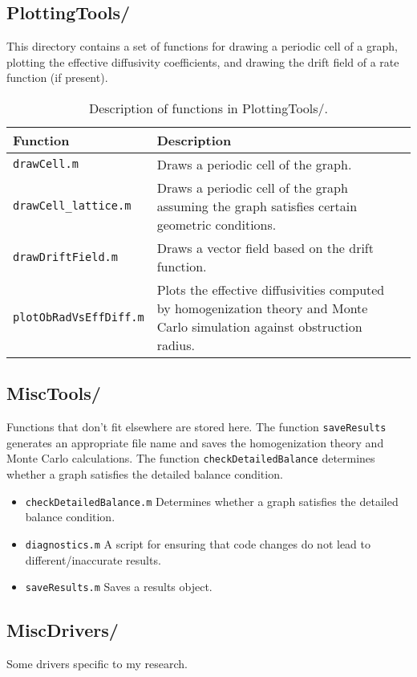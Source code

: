 \documentclass[11pt, oneside]{article}   	%
\theoremstyle{definition}
\begin{document}
\subsection{PlottingTools/}
This directory contains a set of functions for drawing a periodic cell of a graph, plotting the effective diffusivity coefficients, and drawing the drift field of a rate function (if present).
\begin{table}[h]
\centering
\begin{tabularx}{\linewidth}{lLL} %
	\toprule
	Function     & Description \\
	\midrule
	\texttt{drawCell.m} & Draws a periodic cell of the graph. \\ \hline
	\texttt{drawCell\_lattice.m} & Draws a periodic cell of the graph assuming the graph satisfies certain geometric conditions. \\ \hline
	\texttt{drawDriftField.m} & Draws a vector field based on the drift function. \\ \hline
	\texttt{plotObRadVsEffDiff.m} & Plots the effective diffusivities computed by homogenization theory and Monte Carlo simulation against obstruction radius. \\ \hline
	\bottomrule
\end{tabularx}
\caption{Description of functions in PlottingTools/.}
\end{table}

\subsection{MiscTools/}
Functions that don't fit elsewhere are stored here. The function \texttt{saveResults} generates an appropriate file name and saves the homogenization theory and Monte Carlo calculations. The function \texttt{checkDetailedBalance} determines whether a graph satisfies the detailed balance condition.

\begin{itemize}
\item \texttt{checkDetailedBalance.m} Determines whether a graph satisfies the detailed balance condition.
\item \texttt{diagnostics.m} A script for ensuring that code changes do not lead to different/inaccurate results.
\item \texttt{saveResults.m} Saves a results object.
\end{itemize}

\subsection{MiscDrivers/}
Some drivers specific to my research.
\end{document}
